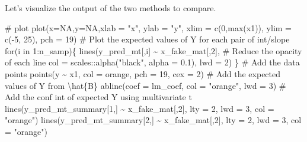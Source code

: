 \documentclass[
  letterpaper,
  DIV=11,
  numbers=noendperiod]{scrreprt}
\newenvironment{Shaded}{\begin{snugshade}}{\end{snugshade}}
\newcommand{\AttributeTok}[1]{\textcolor[rgb]{0.40,0.45,0.13}{#1}}
\newcommand{\CommentTok}[1]{\textcolor[rgb]{0.37,0.37,0.37}{#1}}
\newcommand{\ConstantTok}[1]{\textcolor[rgb]{0.56,0.35,0.01}{#1}}
\newcommand{\ControlFlowTok}[1]{\textcolor[rgb]{0.00,0.23,0.31}{#1}}
\newcommand{\DecValTok}[1]{\textcolor[rgb]{0.68,0.00,0.00}{#1}}
\newcommand{\FloatTok}[1]{\textcolor[rgb]{0.68,0.00,0.00}{#1}}
\newcommand{\FunctionTok}[1]{\textcolor[rgb]{0.28,0.35,0.67}{#1}}
\newcommand{\NormalTok}[1]{\textcolor[rgb]{0.00,0.23,0.31}{#1}}
\newcommand{\SpecialCharTok}[1]{\textcolor[rgb]{0.37,0.37,0.37}{#1}}
\newcommand{\StringTok}[1]{\textcolor[rgb]{0.13,0.47,0.30}{#1}}
\begin{document}
Let's visualize the output of the two methods to compare.

\begin{Shaded}
\begin{Highlighting}[]
\CommentTok{\# plot}
\FunctionTok{plot}\NormalTok{(}\AttributeTok{x=}\ConstantTok{NA}\NormalTok{,}\AttributeTok{y=}\ConstantTok{NA}\NormalTok{,}\AttributeTok{xlab =} \StringTok{"x"}\NormalTok{, }\AttributeTok{ylab =} \StringTok{"y"}\NormalTok{,}
     \AttributeTok{xlim =} \FunctionTok{c}\NormalTok{(}\DecValTok{0}\NormalTok{,}\FunctionTok{max}\NormalTok{(x1)), }\AttributeTok{ylim =} \FunctionTok{c}\NormalTok{(}\SpecialCharTok{{-}}\DecValTok{5}\NormalTok{, }\DecValTok{25}\NormalTok{), }\AttributeTok{pch =} \DecValTok{19}\NormalTok{)}
\CommentTok{\# Plot the expected values of Y for each pair of int/slope }
\ControlFlowTok{for}\NormalTok{(i }\ControlFlowTok{in} \DecValTok{1}\SpecialCharTok{:}\NormalTok{n\_samp)\{}
  \FunctionTok{lines}\NormalTok{(y\_pred\_mt[,i] }\SpecialCharTok{\textasciitilde{}}\NormalTok{ x\_fake\_mat[,}\DecValTok{2}\NormalTok{],}
        \CommentTok{\# Reduce the opacity of each line}
        \AttributeTok{col =}\NormalTok{ scales}\SpecialCharTok{::}\FunctionTok{alpha}\NormalTok{(}\StringTok{"black"}\NormalTok{, }\AttributeTok{alpha =} \FloatTok{0.1}\NormalTok{), }\AttributeTok{lwd =} \DecValTok{2}\NormalTok{)}
\NormalTok{\}}
\CommentTok{\# Add the data points}
\FunctionTok{points}\NormalTok{(y }\SpecialCharTok{\textasciitilde{}}\NormalTok{ x1, }\AttributeTok{col =} \StringTok{\textquotesingle{}orange\textquotesingle{}}\NormalTok{, }\AttributeTok{pch =} \DecValTok{19}\NormalTok{, }\AttributeTok{cex =} \DecValTok{2}\NormalTok{)}
\CommentTok{\# Add the expected values of Y from \textbackslash{}hat\{B\}}
\FunctionTok{abline}\NormalTok{(}\AttributeTok{coef =}\NormalTok{ lm\_coef, }\AttributeTok{col =} \StringTok{"orange"}\NormalTok{, }\AttributeTok{lwd =} \DecValTok{3}\NormalTok{)}
\CommentTok{\# Add the conf int of expected Y using multivariate t}
\FunctionTok{lines}\NormalTok{(y\_pred\_mt\_summary[}\DecValTok{1}\NormalTok{,] }\SpecialCharTok{\textasciitilde{}}\NormalTok{ x\_fake\_mat[,}\DecValTok{2}\NormalTok{], }\AttributeTok{lty =} \DecValTok{2}\NormalTok{, }\AttributeTok{lwd =} \DecValTok{3}\NormalTok{, }\AttributeTok{col =} \StringTok{"orange"}\NormalTok{)}
\FunctionTok{lines}\NormalTok{(y\_pred\_mt\_summary[}\DecValTok{2}\NormalTok{,] }\SpecialCharTok{\textasciitilde{}}\NormalTok{ x\_fake\_mat[,}\DecValTok{2}\NormalTok{], }\AttributeTok{lty =} \DecValTok{2}\NormalTok{, }\AttributeTok{lwd =} \DecValTok{3}\NormalTok{, }\AttributeTok{col =} \StringTok{"orange"}\NormalTok{)}

\end{Highlighting}
\end{Shaded}
\end{document}
